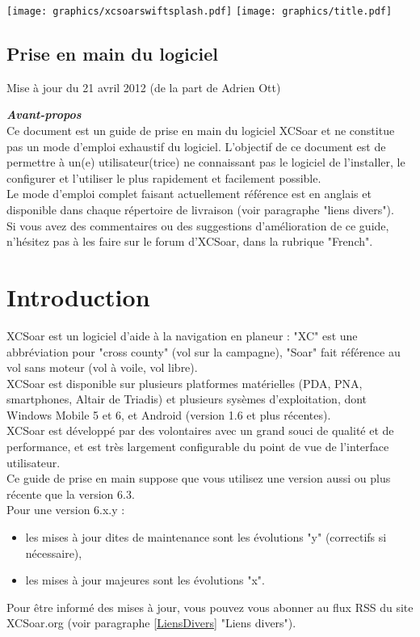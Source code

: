 \documentclass{article}
\begin{document}
%
\begin{center}
\texttt{[image: graphics/xcsoarswiftsplash.pdf]}
\vskip 0.5cm
\texttt{[image: graphics/title.pdf]}
\subsection*{Prise en main du logiciel}
\end{center}
%
\begin{flushright}
Mise à jour du 21 avril 2012 (de la part de Adrien Ott)
\end{flushright}
%
\pagebreak
\noindent
\textbf{\textit{Avant-propos}}\\
Ce document est un guide de prise en main du logiciel XCSoar et ne constitue pas un mode d'emploi exhaustif du logiciel. L'objectif de ce document est de permettre à un(e) utilisateur(trice) ne connaissant pas le logiciel de l'installer, le configurer et l'utiliser le plus rapidement et facilement possible.\\Le mode d'emploi complet faisant actuellement référence est en anglais et disponible dans chaque répertoire de livraison (voir paragraphe "liens divers").\\Si vous avez des commentaires ou des suggestions d'amélioration de ce guide, n'hésitez pas à les faire sur le forum d'XCSoar, dans la rubrique "French".

%

\section{Introduction}
\noindent
XCSoar est un logiciel d'aide à la navigation en planeur : "XC" est une abbréviation pour "cross county" (vol sur la campagne), "Soar" fait référence au vol sans moteur (vol à voile, vol libre).\\
XCSoar est disponible sur plusieurs platformes matérielles (PDA, PNA, smartphones, Altair de Triadis) et plusieurs sysèmes d'exploitation, dont Windows Mobile 5 et 6, et Android (version 1.6 et plus récentes).\\
XCSoar est développé par des volontaires avec un grand souci de qualité et de performance, et est très largement configurable du point de vue de l'interface utilisateur.\\
Ce guide de prise en main suppose que vous utilisez une version aussi ou plus récente que la version 6.3.\\
Pour une version 6.x.y :
\begin{itemize}
\item les mises à jour dites de maintenance sont les évolutions "y" (correctifs si nécessaire),
\item les mises à jour majeures sont les évolutions "x".
\end{itemize}
%
Pour être informé des mises à jour, vous pouvez vous abonner au flux RSS du site XCSoar.org (voir paragraphe \ref{LiensDivers} "Liens divers").\\
%
\end{document}
